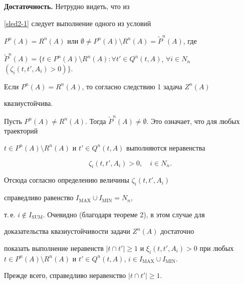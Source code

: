 \begin{pf}


{\bf Достаточность.} Нетрудно видеть, что из


\eqref{sled2-1} следует выполнение одного из условий


$P^n(A)=R^n(A)$ или $\emptyset\neq P^n(A)\setminus


R^n(A)=\widetilde{P}^n(A)$, где


$\widetilde{P}^n(A)=\{t\in


P^n(A)\setminus R^n(A): \forall t'\in Q^n(t, A)$, $\forall


i \in N_n$ $(\zeta_i(t, t', A_i)>0)\}$.





Если $ P^n(A)=R^n(A)$, то согласно следствию 1 задача $Z^n(A)$


квазиустойчива.





Пусть $ P^n(A) \neq R^n(A)$. Тогда $\widetilde{P}^n(A) \neq


\emptyset$. Это означает, что для любых траекторий


$ t\in P^n(A)\setminus R^n(A)$ и $t' \in Q^n(t,


A)$ выполняются неравенства


\begin{equation}\label{sled2-3}


\zeta_i(t, t', A_i)>0,\quad i \in N_n.


\end{equation}


Отсюда согласно определению величины $\zeta_i(t, t', A_i)$


справедливо равенство $I_{\mathrm{MAX}}\cup I_{\mathrm{MIN}}=N_n$,


т.\,е. $i \notin


I_{\mathrm{SUM}}$. Очевидно (благодаря теореме 2), в этом случае для


доказательства квазиустойчивости задачи $Z^n(A)$ достаточно


показать выполнение неравенств $|t \cap t'| \geq 1$ и $\xi_i(t,


t', A_i)>0$ при любых $ t\in P^n(A)\setminus R^n(A)$ и $ t' \in


Q^n(t, A) $, $i\in I_{\mathrm{MAX}} \cup I_{\mathrm{MIN}}$.





Прежде всего, справедливо неравенство $|t \cap t'|\geq 1$.



\end{pf}
